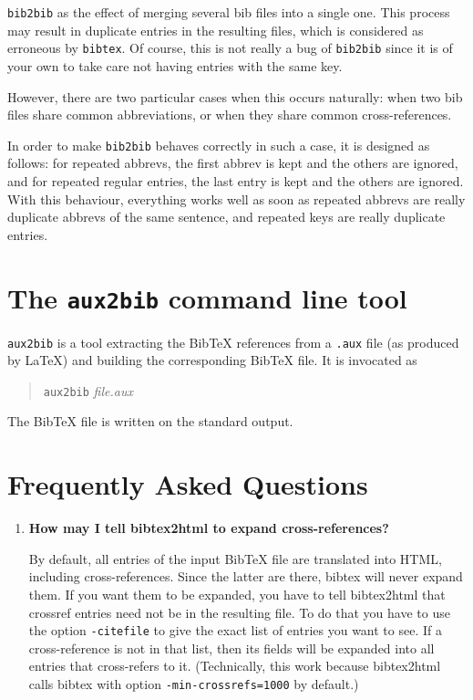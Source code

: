 \documentclass[11pt,a4paper]{article}
\begin{document}
\verb|bib2bib| as the effect of merging several bib files into a
single one. This process may result in duplicate entries in the
resulting files, which is considered as erroneous by \verb|bibtex|.  
Of course, this is not really a bug of \verb|bib2bib| since it is of
your own to take care not having entries with the same key. 

However, there are two particular cases when this occurs naturally:
when two bib files share common abbreviations, or when they share
common cross-references. 

In order to make \verb|bib2bib| behaves correctly in such a case,
it is designed as follows: for repeated abbrevs, the first abbrev is kept and
the others are ignored, and for repeated regular entries, the last entry
is kept and the others are ignored.  With this behaviour, everything
works well as soon as repeated abbrevs are really duplicate abbrevs of
the same sentence, and repeated keys are really duplicate
entries. 


\section{The \texttt{aux2bib} command line tool}

\texttt{aux2bib} is a tool extracting the BibTeX references from a
\texttt{.aux} file (as produced by \LaTeX) and building the
corresponding BibTeX file. It is invocated as
\begin{quote}
\texttt{aux2bib} \textit{file.aux}
\end{quote}
The BibTeX file is written on the standard output.


\section{Frequently Asked Questions}

\begin{enumerate}

\item \textbf{How may I tell bibtex2html to expand cross-references?} ~

  By default, all entries of the input BibTeX file are translated into
  HTML, including cross-references. Since the latter are there, bibtex
  will never expand them. If you want them to be expanded, you have to
  tell bibtex2html that crossref entries need not be in the resulting
  file. To do that you have to use the option \verb|-citefile| to give
  the exact list of entries you want to see. If a cross-reference is
  not in that list, then its fields will be expanded into all entries
  that cross-refers to it. (Technically, this work because bibtex2html
  calls bibtex with option \verb|-min-crossrefs=1000| by default.)
  
\end{enumerate}

\end{document}
